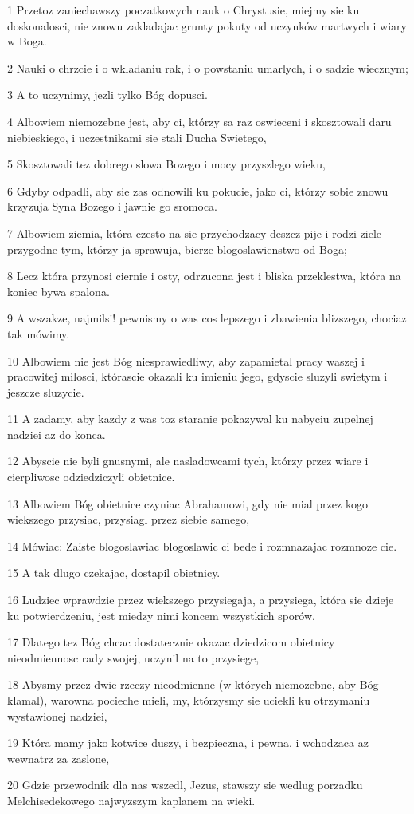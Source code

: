 \par 1 Przetoz zaniechawszy poczatkowych nauk o Chrystusie, miejmy sie ku doskonalosci, nie znowu zakladajac grunty pokuty od uczynków martwych i wiary w Boga.
\par 2 Nauki o chrzcie i o wkladaniu rak, i o powstaniu umarlych, i o sadzie wiecznym;
\par 3 A to uczynimy, jezli tylko Bóg dopusci.
\par 4 Albowiem niemozebne jest, aby ci, którzy sa raz oswieceni i skosztowali daru niebieskiego, i uczestnikami sie stali Ducha Swietego,
\par 5 Skosztowali tez dobrego slowa Bozego i mocy przyszlego wieku,
\par 6 Gdyby odpadli, aby sie zas odnowili ku pokucie, jako ci, którzy sobie znowu krzyzuja Syna Bozego i jawnie go sromoca.
\par 7 Albowiem ziemia, która czesto na sie przychodzacy deszcz pije i rodzi ziele przygodne tym, którzy ja sprawuja, bierze blogoslawienstwo od Boga;
\par 8 Lecz która przynosi ciernie i osty, odrzucona jest i bliska przeklestwa, która na koniec bywa spalona.
\par 9 A wszakze, najmilsi! pewnismy o was cos lepszego i zbawienia blizszego, chociaz tak mówimy.
\par 10 Albowiem nie jest Bóg niesprawiedliwy, aby zapamietal pracy waszej i pracowitej milosci, którascie okazali ku imieniu jego, gdyscie sluzyli swietym i jeszcze sluzycie.
\par 11 A zadamy, aby kazdy z was toz staranie pokazywal ku nabyciu zupelnej nadziei az do konca.
\par 12 Abyscie nie byli gnusnymi, ale nasladowcami tych, którzy przez wiare i cierpliwosc odziedziczyli obietnice.
\par 13 Albowiem Bóg obietnice czyniac Abrahamowi, gdy nie mial przez kogo wiekszego przysiac, przysiagl przez siebie samego,
\par 14 Mówiac: Zaiste blogoslawiac blogoslawic ci bede i rozmnazajac rozmnoze cie.
\par 15 A tak dlugo czekajac, dostapil obietnicy.
\par 16 Ludziec wprawdzie przez wiekszego przysiegaja, a przysiega, która sie dzieje ku potwierdzeniu, jest miedzy nimi koncem wszystkich sporów.
\par 17 Dlatego tez Bóg chcac dostatecznie okazac dziedzicom obietnicy nieodmiennosc rady swojej, uczynil na to przysiege,
\par 18 Abysmy przez dwie rzeczy nieodmienne (w których niemozebne, aby Bóg klamal), warowna pocieche mieli, my, którzysmy sie uciekli ku otrzymaniu wystawionej nadziei,
\par 19 Która mamy jako kotwice duszy, i bezpieczna, i pewna, i wchodzaca az wewnatrz za zaslone,
\par 20 Gdzie przewodnik dla nas wszedl, Jezus, stawszy sie wedlug porzadku Melchisedekowego najwyzszym kaplanem na wieki.

